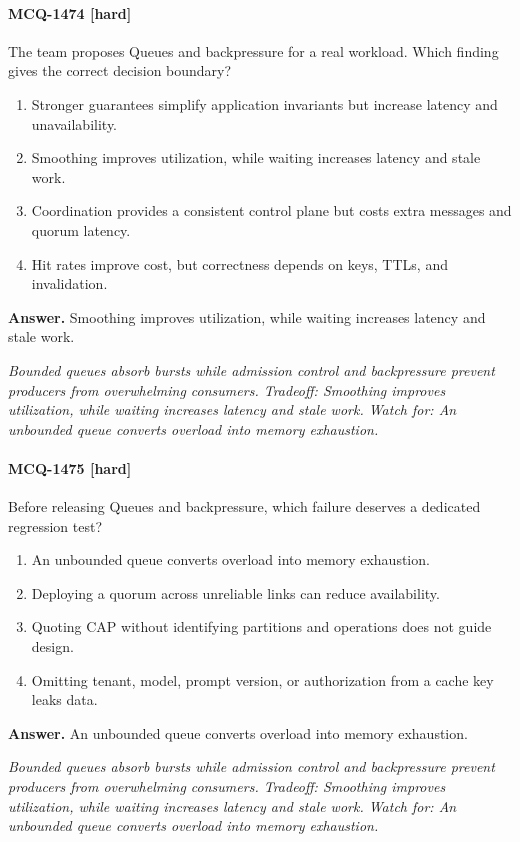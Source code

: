 \paragraph{MCQ-1474 [hard]} The team proposes Queues and backpressure for a real workload. Which finding gives the correct decision boundary?
\begin{enumerate}[label=\Alph*.]
\item Stronger guarantees simplify application invariants but increase latency and unavailability.
\item Smoothing improves utilization, while waiting increases latency and stale work.
\item Coordination provides a consistent control plane but costs extra messages and quorum latency.
\item Hit rates improve cost, but correctness depends on keys, TTLs, and invalidation.
\end{enumerate}
\noindent\textbf{Answer.} Smoothing improves utilization, while waiting increases latency and stale work.
\par\textit{Bounded queues absorb bursts while admission control and backpressure prevent producers from overwhelming consumers. Tradeoff: Smoothing improves utilization, while waiting increases latency and stale work. Watch for: An unbounded queue converts overload into memory exhaustion.}
\paragraph{MCQ-1475 [hard]} Before releasing Queues and backpressure, which failure deserves a dedicated regression test?
\begin{enumerate}[label=\Alph*.]
\item An unbounded queue converts overload into memory exhaustion.
\item Deploying a quorum across unreliable links can reduce availability.
\item Quoting CAP without identifying partitions and operations does not guide design.
\item Omitting tenant, model, prompt version, or authorization from a cache key leaks data.
\end{enumerate}
\noindent\textbf{Answer.} An unbounded queue converts overload into memory exhaustion.
\par\textit{Bounded queues absorb bursts while admission control and backpressure prevent producers from overwhelming consumers. Tradeoff: Smoothing improves utilization, while waiting increases latency and stale work. Watch for: An unbounded queue converts overload into memory exhaustion.}
